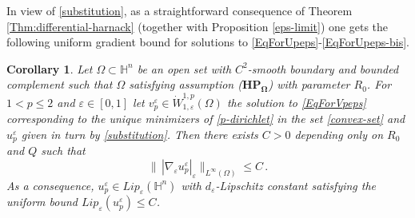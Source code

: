 \documentclass[10pt]{amsart}
\numberwithin{equation}{section}
\newtheorem{corollary}[theorem]{Corollary}
\theoremstyle{definition}
\newcommand{\He}{\mathbb{H}}
\begin{document}

In view of \eqref{substitution}, as a straightforward consequence of Theorem \ref{Thm:differential-harnack}  (together with Proposition \ref{eps-limit}) one gets the following uniform gradient bound for solutions to \eqref{EqForUpeps}-\eqref{EqForUpeps-bis}.

\begin{corollary}
\label{Cor:gradbound}
Let $\Omega \subset \He^n$ be an open set with $C^2$-smooth boundary and bounded complement such that $\Omega$ satisfying assumption ($\mathbf{HP_\Omega}$) with parameter $R_0$. For $1<p \leq 2$ and $\varepsilon \in [0,1]$ let $v^\varepsilon_p \in \dot{W}^{1,p}_{1,\varepsilon}(\Omega)$  the solution to \eqref{EqForVpeps} corresponding to the unique minimizers of \eqref{p-dirichlet} in the set \eqref{convex-set} and $u_p^\varepsilon$ given in turn by \eqref{substitution}. Then there exists $C>0$ depending only on $R_0$ and $Q$ such that 
\begin{equation}
\label{globalgradbound}
\| \, |\nabla_\varepsilon u_p^\varepsilon|_\varepsilon \|_{L^\infty (\Omega)} \leq C \, .
\end{equation}
As a consequence, $u_p^\varepsilon \in Lip_\varepsilon(\He^n)$ with $d_\varepsilon$-Lipschitz constant satisfying the uniform bound $Lip_\varepsilon (u_p^\varepsilon) \leq C$.
  \end{corollary}
\end{document}
